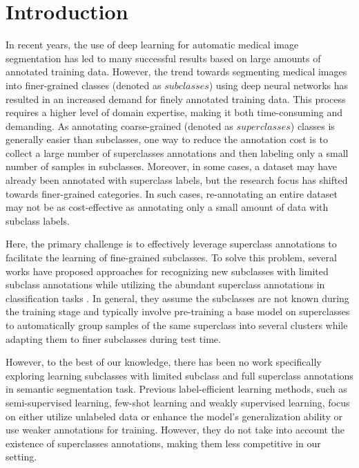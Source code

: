 \documentclass[runningheads]{llncs}
\begin{document}
\section{Introduction}
In recent years, the use of deep learning for automatic medical image segmentation has led to many successful results based on large amounts of annotated training data. However, the trend towards segmenting medical images into finer-grained classes (denoted as $subclasses$) using deep neural networks has resulted in an increased demand for finely annotated training data\cite{bakas2018identifying, sekuboyina2021verse, he2021synergistic}. This process requires a higher level of domain expertise, making it both time-consuming and demanding. As annotating coarse-grained (denoted as $superclasses$) classes is generally easier than subclasses, one way to reduce the annotation cost is to collect a large number of superclasses annotations and then labeling only a small number of samples in subclasses. Moreover, in some cases, a dataset may have already been annotated with superclass labels, but the research focus has shifted towards finer-grained categories\cite{finer1, finer2}. 
In such cases, re-annotating an entire dataset may not be as cost-effective as annotating only a small amount of data with subclass labels. 
\par Here, the primary challenge is to effectively leverage superclass annotations to facilitate the learning of fine-grained subclasses. To solve this problem, several works have proposed approaches for recognizing new subclasses with limited subclass annotations while utilizing the abundant superclass annotations in classification tasks \cite{bukchin2021fine, fotakis2021efficient, yang2021towards, ni2021superclass}. In general, they assume the subclasses are not known during the training stage and typically involve pre-training a base model on superclasses to automatically group samples of the same superclass into several clusters while adapting them to finer subclasses during test time.

\par However, to the best of our knowledge, there has been no work specifically exploring learning subclasses with limited subclass and full superclass annotations in semantic segmentation task. Previous label-efficient learning methods, such as semi-supervised learning\cite{yu2019uncertainty, chen2021semi, luo2022semi}, few-shot learning\cite{lei2021one, hansen2022anomaly, ouyang2020self} and weakly supervised learning\cite{kervadec2020bounding, zhang2022cyclemix}, focus on either utilize unlabeled data or enhance the model's generalization ability or use weaker annotations for training. However, they do not take into account the existence of superclasses annotations, making them less competitive in our setting. 
\end{document}
